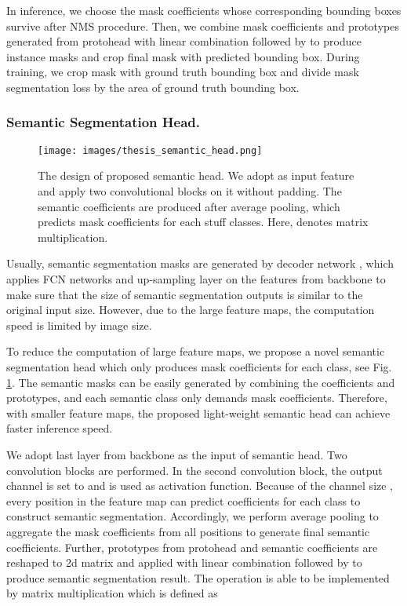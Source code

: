 \documentclass[runningheads]{llncs}
\begin{document}
In inference, we choose the mask coefficients whose corresponding bounding boxes survive after NMS procedure. Then, we combine mask coefficients and prototypes  generated from protohead with linear combination followed by  to produce instance masks and crop final mask with predicted bounding box. During training, we crop mask with ground truth bounding box and divide mask segmentation loss by the area of ground truth bounding box.

\subsubsection{Semantic Segmentation Head.}

\begin{figure}[!tb]
\centering
\texttt{[image: images/thesis\_semantic\_head.png]}
\caption{The design of proposed semantic head. We adopt  as input feature and apply two convolutional blocks on it without padding. The semantic coefficients are produced after average pooling, which predicts  mask coefficients for each stuff classes. Here,  denotes matrix multiplication. }
\label{fig:sem_head}
\end{figure}

Usually, semantic segmentation masks are generated by decoder network \cite{Lin2017a,Zhang2018,Zhao2016,Long2015}, which applies FCN \cite{Long2015} networks and up-sampling layer on the features from backbone to make sure that the size of semantic segmentation outputs is similar to the original input size. However, due to the large feature maps, the computation speed is limited by image size.

To reduce the computation of large feature maps, we propose a novel semantic segmentation head which only produces mask coefficients for each class, see Fig. \ref{fig:sem_head}. The semantic masks can be easily generated by combining the coefficients and prototypes, and each semantic class only demands  mask coefficients. Therefore, with smaller feature maps, the proposed light-weight semantic head can achieve faster inference speed.


We adopt last layer  from backbone as the input of semantic head. Two convolution blocks are performed. In the second convolution block, the output channel is set to  and  is used as activation function. Because of the channel size , every position in the feature map can predict  coefficients for each class to construct semantic segmentation. Accordingly, we perform average pooling to aggregate the mask coefficients from all positions to generate final semantic coefficients. Further, prototypes from protohead and semantic coefficients are reshaped to 2d matrix and applied with linear combination followed by  to produce semantic segmentation result. The operation is able to be implemented by matrix multiplication which is defined as
\end{document}

